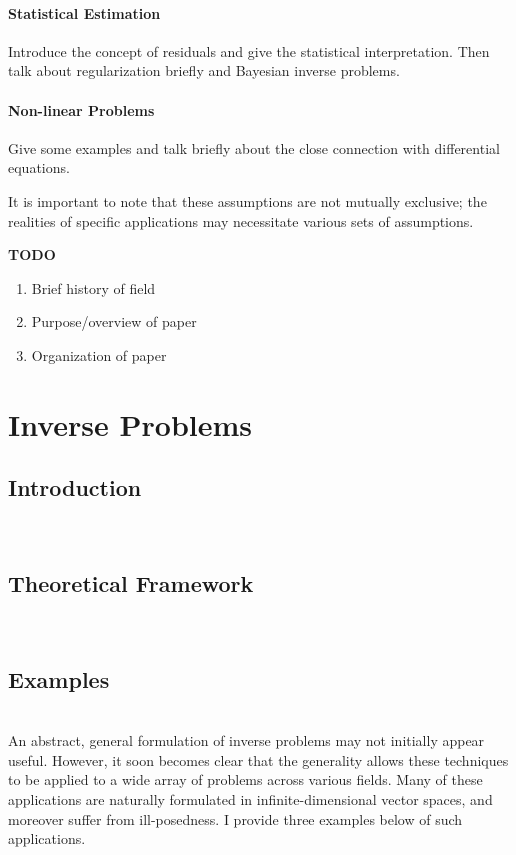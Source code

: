 \documentclass[12pt]{article}
\begin{document}
\paragraph*{Statistical Estimation}

Introduce the concept of residuals and give the statistical interpretation. Then talk about regularization briefly
and Bayesian inverse problems. 

\paragraph*{Non-linear Problems}

Give some examples and talk briefly about the close connection with differential equations. 

It is important to note that these assumptions are not mutually exclusive; the realities of specific applications
may necessitate various sets of assumptions.




\textbf{TODO}
\begin{enumerate} 
\item Brief history of field
\item Purpose/overview of paper
\item Organization of paper
\end{enumerate} 

\section{Inverse Problems}

\subsection{Introduction} \hfill \\
 



 
 \subsection{Theoretical Framework} \hfill \\
 
 \subsection{Examples} \hfill \\
 An abstract, general formulation of inverse problems may not initially appear useful. However, it soon becomes clear that the generality allows these techniques to be applied to a wide array of problems across various fields. Many of these applications are naturally formulated in infinite-dimensional vector spaces, and moreover suffer from ill-posedness. I provide three examples below of such applications. 
 
\end{document}

